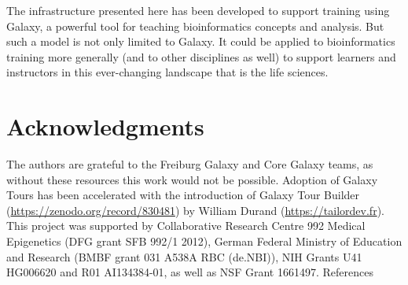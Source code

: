 The infrastructure presented here has been developed to support training using Galaxy, a powerful tool for teaching bioinformatics concepts and analysis. But such a model is not only limited to Galaxy. It could be applied to bioinformatics training more generally (and to other disciplines as well) to support learners and instructors in this ever-changing landscape that is the life sciences.


\section*{Acknowledgments}
The authors are grateful to the Freiburg Galaxy and Core Galaxy teams, as without these resources this work would not be possible. Adoption of Galaxy Tours has been accelerated with the introduction of Galaxy Tour Builder (\url{https://zenodo.org/record/830481}) by William Durand (\url{https://tailordev.fr}). This project was supported by Collaborative Research Centre 992 Medical Epigenetics (DFG grant SFB 992/1 2012), German Federal Ministry of Education and Research (BMBF grant 031 A538A RBC (de.NBI)), NIH Grants U41 HG006620 and R01 AI134384-01, as well as NSF Grant 1661497.
References




